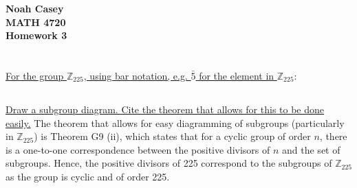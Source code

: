 \documentclass[10pt,a4paper]{report}
\begin{document}
\begin{center}
\textbf{Noah Casey}\\
\textbf{MATH 4720}\\
\textbf{Homework 3}
\end{center}

\section{}
\underline{For the group $\mathbb{Z}_{225}$, using bar notation, e.g. $\bar{5}$ for the element in $\mathbb{Z}_{225}$}:

\subsection{}
\underline{Draw a subgroup diagram. Cite the theorem that allows for this to be done easily.}\newline
\indent The theorem that allows for easy diagramming of subgroups (particularly in $\mathbb{Z}_{225}$) is Theorem G9 (ii), which states that for a cyclic group of order $n$, there is a one-to-one correspondence between the positive divisors of $n$ and the set of subgroups. Hence, the positive divisors of 225 correspond to the subgroups of $\mathbb{Z}_{225}$ as the group is cyclic and of order 225.
    
    \begin{center}
    \newcommand{\mydistance}{.6cm}
    \end{center}
\end{document}
